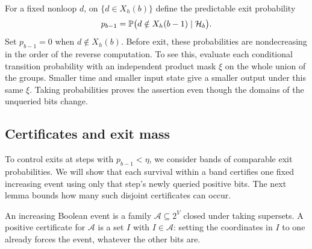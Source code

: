 For a fixed nonloop $d$, on $\{d\in X_h(b)\}$ define the predictable exit
probability
\begin{equation}\label{eq:exit-probability}
 p_{b-1}=\mathbb P\bigl(d\notin X_h(b-1)\mid\mathcal H_b\bigr).
\end{equation}
Set $p_{b-1}=0$ when $d\notin X_h(b)$. Before exit, these probabilities
are nondecreasing in the order of the reverse computation. To see this,
evaluate each conditional transition probability with an independent
product mask $\xi$ on the whole union of the groups. Smaller time and
smaller input state give a smaller output under this same $\xi$.
Taking probabilities proves the assertion even though the domains of
the unqueried bits change.

\subsection{Certificates and exit mass}

To control exits at steps with $p_{b-1}<\eta$, we consider bands of
comparable exit probabilities. We will show that each survival within a
band certifies one fixed increasing event using only that step's newly
queried positive bits. The next lemma bounds how many such disjoint
certificates can occur.

An increasing Boolean event is a family $\mathcal A\subseteq2^V$ closed
under taking supersets. A positive certificate for $\mathcal A$ is a set
$I$ with $I\in\mathcal A$: setting the coordinates in $I$ to one already
forces the event, whatever the other bits are.

